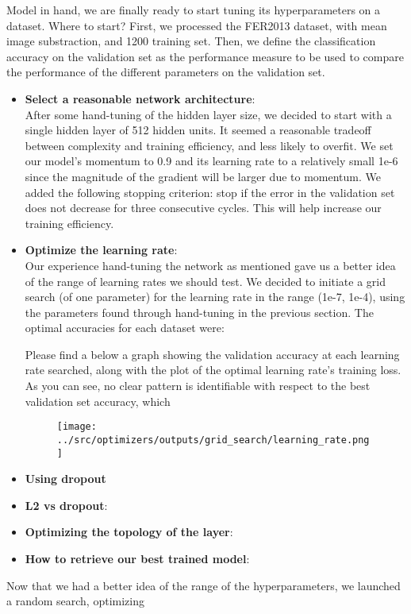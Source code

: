 Model in hand, we are finally ready to start tuning its hyperparameters on a dataset.
Where to start?
First, we processed the FER2013 dataset, with mean image substraction, and 1200 training set.
Then, we define the classification accuracy on the validation set as
the performance measure to be used to compare the performance of the different parameters on the validation set.

\begin{itemize}
\item \textbf{Select a reasonable network architecture}:\\
  After some hand-tuning of the hidden layer size, we decided to start with a single hidden layer of 512 hidden units.
  It seemed a reasonable tradeoff between complexity and training efficiency, and less likely to overfit.
  We set our model's momentum to 0.9 and its learning rate to a relatively small 1e-6
  since the magnitude of the gradient will be larger due to momentum.
  We added the following stopping criterion: stop if the error in the validation set does not decrease for three consecutive cycles.
  This will help increase our training efficiency.

\item \textbf{Optimize the learning rate}:\\
  Our experience hand-tuning the network as mentioned gave us a better idea of the range of learning rates we should test.
  We decided to initiate a grid search (of one parameter) for the learning rate in the range (1e-7, 1e-4),
  using the parameters found through hand-tuning in the previous section.
  The optimal accuracies for each dataset were:
  
  Please find a below a graph showing the validation accuracy at each learning rate searched,
  along with the plot of the optimal learning rate's training loss.
  As you can see, no clear pattern is identifiable with respect to the best validation set accuracy, which 
  \begin{figure}[!ht]
      \centering
      {{\texttt{[image: ../src/optimizers/outputs/grid\_search/learning\_rate.png]}}}
  \end{figure}


\item \textbf{Using dropout}\\


\item \textbf{L2 vs dropout}:\\

\item \textbf{Optimizing the topology of the layer}:\\  
  
\item \textbf{How to retrieve our best trained model}:\\
\end{itemize}
  



Now that we had a better idea of the range of the hyperparameters, we launched a random search, optimizing

